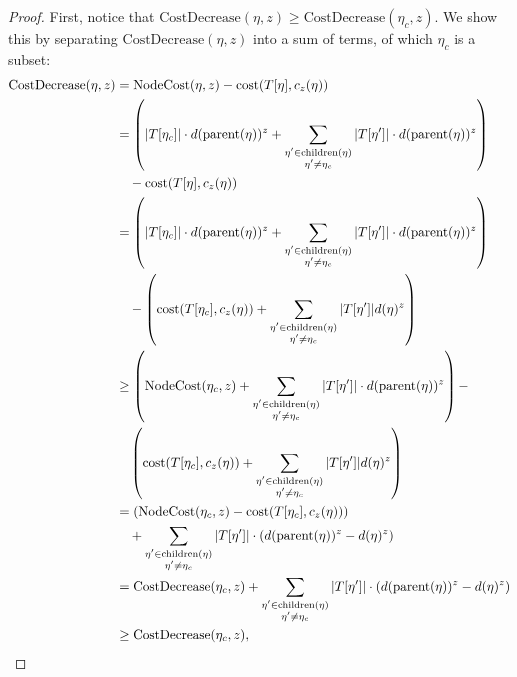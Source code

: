 \begin{proof}
    First, notice that $\text{CostDecrease}(\eta, z) \geq \text{CostDecrease}(\eta_c, z)$. We show this by separating $\text{CostDecrease}(\eta, z)$ into a sum of terms, of which $\eta_c$ is a subset:
    \begingroup
    \allowdisplaybreaks
    \begin{align*} 
        \text{CostDecrease}(\eta, z) &= \text{NodeCost}(\eta, z) - \text{cost}(T[\eta], c_z(\eta)) \\
        &= \left( |T[\eta_c]| \cdot d(\text{parent}(\eta))^z + \sum_{\substack{\eta' \in \text{children}(\eta) \\ \eta' \neq \eta_c}}|T[\eta']| \cdot
        d(\text{parent}(\eta))^z\right) \\
        &\quad - \text{cost}(T[\eta], c_z(\eta)) \\
        &= \left( |T[\eta_c]| \cdot d(\text{parent}(\eta))^z + \sum_{\substack{\eta' \in \text{children}(\eta) \\ \eta' \neq \eta_c}}|T[\eta']| \cdot
        d(\text{parent}(\eta))^z \right) \\
        &\quad - \left( \text{cost}(T[\eta_c], c_z(\eta)) + \sum_{\substack{\eta' \in \text{children}(\eta) \\ \eta' \neq \eta_c}} |T[\eta']| d(\eta)^z \right)\\
        &\geq \left( \text{NodeCost}(\eta_c, z) + \sum_{\substack{\eta' \in \text{children}(\eta) \\ \eta' \neq \eta_c}}|T[\eta']| \cdot d(\text{parent}(\eta))^z \right) -\\
        &\quad \left( \text{cost}(T[\eta_c], c_z(\eta)) + \sum_{\substack{\eta' \in \text{children}(\eta) \\ \eta' \neq \eta_c}} |T[\eta']| d(\eta)^z \right)\\
        &= \left( \text{NodeCost}(\eta_c, z) - \text{cost}(T[\eta_c], c_z(\eta)) \right) \\
        &\quad + \sum_{\substack{\eta' \in \text{children}(\eta) \\ \eta' \neq \eta_c}}|T[\eta']| \cdot \left( d(\text{parent}(\eta))^z - d(\eta)^z \right) \\
        &= \text{CostDecrease}(\eta_c, z) + \sum_{\substack{\eta' \in \text{children}(\eta) \\ \eta' \neq \eta_c}}|T[\eta']| \cdot \left( d(\text{parent}(\eta))^z - d(\eta)^z \right) \\
        &\geq \text{CostDecrease}(\eta_c, z),
    \end{align*}
    \endgroup


\end{proof}
